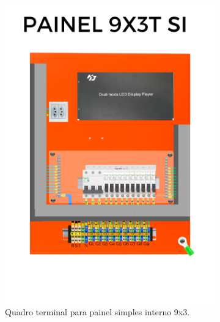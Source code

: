 \begin{figure}
\centering
\begin{subfigure}{0.4\textwidth}
	\includegraphics[width=\textwidth]{image/9.png}
	\caption{Quadro terminal para painel simples interno 9x3.}
	\label{fig:advQD_1}
\end{subfigure}
\hfill
\begin{subfigure}{0.4\textwidth}

\end{subfigure}
\end{figure}
